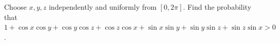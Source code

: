 Choose $x,y,z$ independently and uniformly from $[0,2\pi]$. Find the probability that $1+\cos x\cos y+\cos y\cos z+\cos z\cos x+\sin x\sin y+\sin y\sin z+\sin z\sin x>0$.

